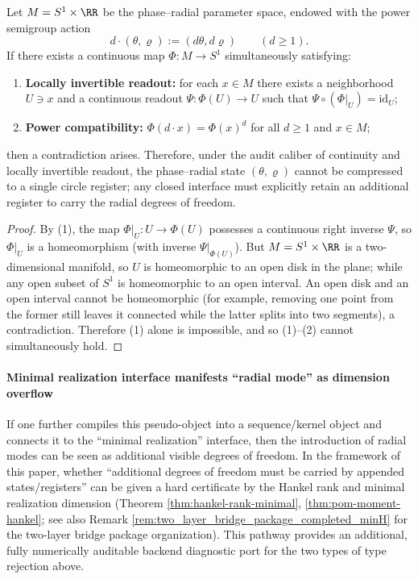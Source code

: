 \begin{theorem}\label{thm:radial-dimension-obstruction}
Let \(M=S^{1}\times\RR\) be the phase--radial parameter space, endowed with the power semigroup action
\[
d\cdot(\theta,\varrho):=(d\theta,d\varrho)\qquad(d\ge 1).
\]
If there exists a continuous map \(\Phi:M\to S^{1}\) simultaneously satisfying:
\begin{enumerate}
  \item \textbf{Locally invertible readout:} for each \(x\in M\) there exists a neighborhood \(U\ni x\) and a continuous readout \(\Psi:\Phi(U)\to U\) such that \(\Psi\circ(\Phi|_{U})=\mathrm{id}_{U}\);
  \item \textbf{Power compatibility:} \(\Phi(d\cdot x)=\Phi(x)^{d}\) for all \(d\ge 1\) and \(x\in M\);
\end{enumerate}
then a contradiction arises.
Therefore, under the audit caliber of continuity and locally invertible readout, the phase--radial state \((\theta,\varrho)\) cannot be compressed to a single circle register; any closed interface must explicitly retain an additional register to carry the radial degrees of freedom.
\end{theorem}
\begin{proof}
By (1), the map \(\Phi|_{U}:U\to \Phi(U)\) possesses a continuous right inverse \(\Psi\), so \(\Phi|_{U}\) is a homeomorphism (with inverse \(\Psi|_{\Phi(U)}\)).
But \(M=S^{1}\times\RR\) is a two-dimensional manifold, so \(U\) is homeomorphic to an open disk in the plane; while any open subset of \(S^{1}\) is homeomorphic to an open interval.
An open disk and an open interval cannot be homeomorphic (for example, removing one point from the former still leaves it connected while the latter splits into two segments), a contradiction.
Therefore (1) alone is impossible, and so (1)--(2) cannot simultaneously hold. \qedhere
\end{proof}

\paragraph{Minimal realization interface manifests ``radial mode'' as dimension overflow}
If one further compiles this pseudo-object into a sequence/kernel object and connects it to the ``minimal realization'' interface, then the introduction of radial modes can be seen as additional visible degrees of freedom.
In the framework of this paper, whether ``additional degrees of freedom must be carried by appended states/registers'' can be given a hard certificate by the Hankel rank and minimal realization dimension (Theorem \ref{thm:hankel-rank-minimal}, \ref{thm:pom-moment-hankel}; see also Remark \ref{rem:two_layer_bridge_package_completed_minH} for the two-layer bridge package organization).
This pathway provides an additional, fully numerically auditable backend diagnostic port for the two types of type rejection above.

